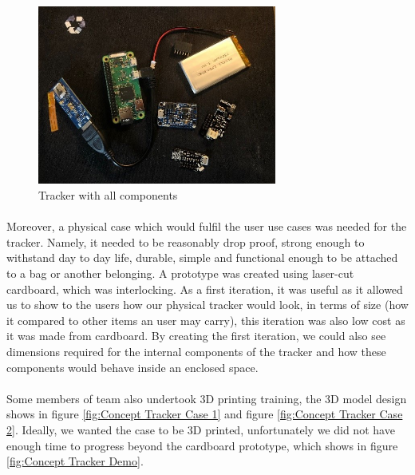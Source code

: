 \documentclass[12pt,a4paper]{article}
\begin{document}
        \begin{figure}[H]
          \centering
          \includegraphics[width=0.7\textwidth]{../assets/design-tracker-with-all-components.jpg}
          \caption{Tracker with all components}
          \label{fig:Tracker with all components}
        \end{figure}
        
        \paragraph{} Moreover, a physical case which would fulfil the user use cases was needed for the tracker. Namely, it needed to be reasonably drop proof, strong enough to withstand day to day life, durable, simple and functional enough to be attached to a bag or another belonging. A prototype was created using laser-cut cardboard, which was interlocking. As a first iteration, it was useful as it allowed us to show to the users how our physical tracker would look, in terms of size (how it compared to other items an user may carry), this iteration was also low cost as it was made from cardboard. By creating the first iteration, we could also see dimensions required for the internal components of the tracker and how these components would behave inside an enclosed space.
        
        \paragraph{} Some members of team also undertook 3D printing training, the 3D model design shows in figure \ref{fig:Concept Tracker Case 1} and figure \ref{fig:Concept Tracker Case 2}. Ideally, we wanted the case to be 3D printed, unfortunately we did not have enough time to progress beyond the cardboard prototype, which shows in figure \ref{fig:Concept Tracker Demo}.
        
\end{document}

